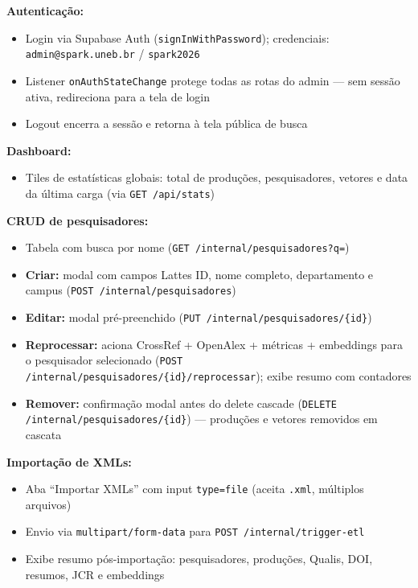 \documentclass[12pt,a4paper]{article}
\begin{document}
\textbf{Autenticação:}
\begin{itemize}[noitemsep]
  \item Login via Supabase Auth (\texttt{signInWithPassword}); credenciais: \texttt{admin@spark.uneb.br}
        / \texttt{spark2026}
  \item Listener \texttt{onAuthStateChange} protege todas as rotas do admin — sem sessão ativa,
        redireciona para a tela de login
  \item Logout encerra a sessão e retorna à tela pública de busca
\end{itemize}

\textbf{Dashboard:}
\begin{itemize}[noitemsep]
  \item Tiles de estatísticas globais: total de produções, pesquisadores, vetores e data da última carga
        (via \texttt{GET /api/stats})
\end{itemize}

\textbf{CRUD de pesquisadores:}
\begin{itemize}[noitemsep]
  \item Tabela com busca por nome (\texttt{GET /internal/pesquisadores?q=})
  \item \textbf{Criar:} modal com campos Lattes ID, nome completo, departamento e campus
        (\texttt{POST /internal/pesquisadores})
  \item \textbf{Editar:} modal pré-preenchido (\texttt{PUT /internal/pesquisadores/\{id\}})
  \item \textbf{Reprocessar:} aciona CrossRef + OpenAlex + métricas + embeddings para o pesquisador
        selecionado (\texttt{POST /internal/pesquisadores/\{id\}/reprocessar}); exibe resumo com contadores
  \item \textbf{Remover:} confirmação modal antes do delete cascade
        (\texttt{DELETE /internal/pesquisadores/\{id\}}) — produções e vetores removidos em cascata
\end{itemize}

\textbf{Importação de XMLs:}
\begin{itemize}[noitemsep]
  \item Aba ``Importar XMLs'' com input \texttt{type=file} (aceita \texttt{.xml}, múltiplos arquivos)
  \item Envio via \texttt{multipart/form-data} para \texttt{POST /internal/trigger-etl}
  \item Exibe resumo pós-importação: pesquisadores, produções, Qualis, DOI, resumos, JCR e embeddings
\end{itemize}
\end{document}
